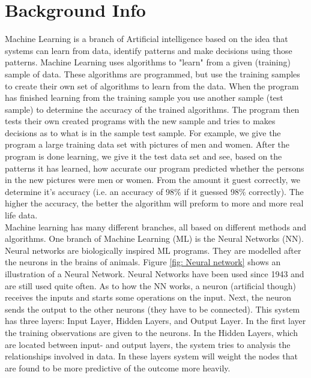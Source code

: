 \section{Background Info}

\noindent Machine Learning is a branch of Artificial intelligence based on the idea that systems can learn from data, identify patterns and make decisions using those patterns.
Machine Learning uses algorithms to "learn" from a given (training) sample of data.
These algorithms are programmed, but use the training samples to create their own set of algorithms to learn from the data.
When the program has finished learning from the training sample you use another sample (test sample) to determine the accuracy of the trained algorithms.
The program then tests their own created programs with the new sample and tries to makes decisions as to what is in the sample test sample.
For example, we give the program a large training data set with pictures of men and women.
After the program is done learning, we give it the test data set and see, based on the patterns it has learned, how accurate our program predicted whether the persons in the new pictures were men or women.
From the amount it guest correctly, we determine it's accuracy (i.e. an accuracy of 98\% if it guessed 98\% correctly).
The higher the accuracy, the better the algorithm will preform to more and more real life data.\\

\noindent Machine learning has many different branches, all based on different methods and algorithms.
One branch of Machine Learning (ML) is the Neural Networks (NN).
Neural networks are biologically inspired ML programs.
They are modelled after the neurons in the brains of animals.
Figure \ref{fig: Neural network} shows an illustration of a Neural Network.
Neural Networks have been used since 1943 and are still used quite often.
As to how the NN works, a neuron (artificial though) receives the inputs and starts some operations on the input.
Next, the neuron sends the output to the other neurons (they have to be connected).
This system has three layers: Input Layer, Hidden Layers, and Output Layer.
In the first layer the training observations are given to the neurons.
In the Hidden Layers, which are located between input- and output layers, the system tries to analysis the relationships involved in data.
In these layers system will weight the nodes that are found to be more predictive of the outcome more heavily.\\

